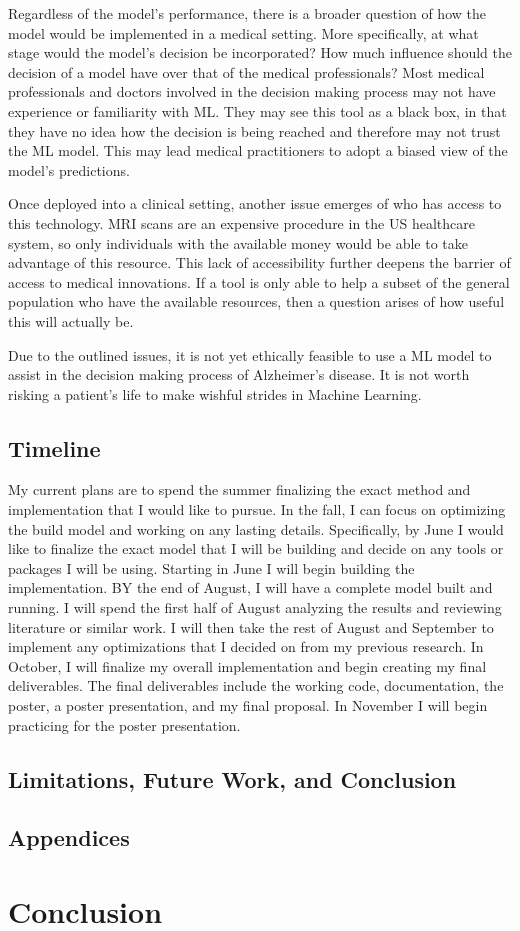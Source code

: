 \documentclass[10pt,twocolumn]{article}
\begin{document}
Regardless of the model’s performance, there is a broader question of how the model would be implemented in a medical setting. More specifically, at what stage would the model’s decision be incorporated? How much influence should the decision of a model have over that of the medical professionals? Most medical professionals and doctors involved in the decision making process may not have experience or familiarity with ML. They may see this tool as a black box, in that they have no idea how the decision is being reached and therefore may not trust the ML model. This may lead medical practitioners to adopt a biased view of the model's predictions. 

Once deployed into a clinical setting, another issue emerges of who has access to this technology. MRI scans are an expensive procedure in the US healthcare system, so only individuals with the available money would be able to take advantage of this resource. This lack of accessibility further deepens the barrier of access to medical innovations. If a tool is only able to help a subset of the general population who have the available resources, then a question arises of how useful this will actually be.

Due to the outlined issues, it is not yet ethically feasible to use a ML model to assist in the decision making process of Alzheimer’s disease. It is not worth risking a patient’s life to make wishful strides in Machine Learning. 
\subsection{Timeline}
My current plans are to spend the summer finalizing the exact method and implementation that I would like to pursue. In the fall, I can focus on optimizing the build model and working on any lasting details. Specifically, by June I would like to finalize the exact model that I will be building and decide on any tools or packages I will be using. Starting in June I will begin building the implementation. BY the end of August, I will have a complete model built and running. I will spend the first half of August analyzing the results and reviewing literature or similar work. I will then take the rest of August and September to implement any optimizations that I decided on from my previous research. In October, I will finalize my overall implementation and begin creating my final deliverables. The final deliverables include the working code, documentation, the poster, a poster presentation, and my final proposal. In November I will begin practicing for the poster presentation. 
\subsection{Limitations, Future Work, and Conclusion}

\subsection{Appendices}

\section{Conclusion}

\printbibliography 
\end{document}
